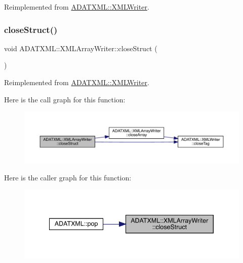 Reimplemented from \mbox{\hyperlink{classADATXML_1_1XMLWriter_ade5512a07806893fe3aaebb897580569}{A\+D\+A\+T\+X\+M\+L\+::\+X\+M\+L\+Writer}}.

\mbox{\label{classADATXML_1_1XMLArrayWriter_a5a849f8851bce99654c44dc08b1fe486}} 
\subsubsection{\texorpdfstring{closeStruct()}{closeStruct()}\hspace{0.1cm}{\footnotesize\ttfamily [3/3]}}
{\footnotesize\ttfamily void A\+D\+A\+T\+X\+M\+L\+::\+X\+M\+L\+Array\+Writer\+::close\+Struct (\begin{DoxyParamCaption}{ }\end{DoxyParamCaption})\hspace{0.3cm}{\ttfamily [virtual]}}



Reimplemented from \mbox{\hyperlink{classADATXML_1_1XMLWriter_ade5512a07806893fe3aaebb897580569}{A\+D\+A\+T\+X\+M\+L\+::\+X\+M\+L\+Writer}}.

Here is the call graph for this function\+:
\nopagebreak
\begin{figure}[H]
\begin{center}
\leavevmode
\includegraphics[width=350pt]{dc/df3/classADATXML_1_1XMLArrayWriter_a5a849f8851bce99654c44dc08b1fe486_cgraph}
\end{center}
\end{figure}
Here is the caller graph for this function\+:
\nopagebreak
\begin{figure}[H]
\begin{center}
\leavevmode
\includegraphics[width=340pt]{dc/df3/classADATXML_1_1XMLArrayWriter_a5a849f8851bce99654c44dc08b1fe486_icgraph}
\end{center}
\end{figure}
\mbox{\label{classADATXML_1_1XMLArrayWriter_aae20d7fa7fe499da36f54ae08b64860e}} 
